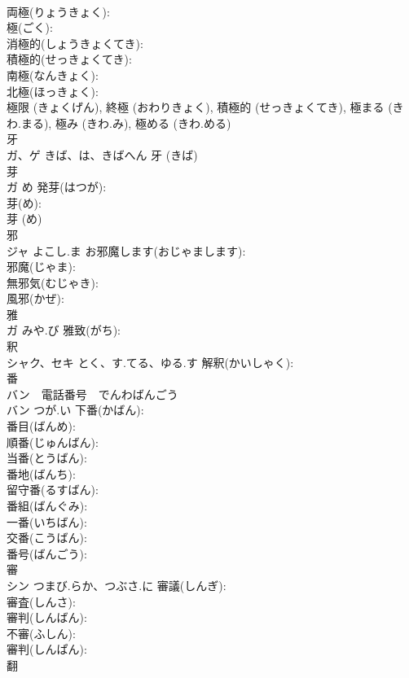 \documentclass[8pt]{extreport}
\begin{document}
\begin{CJK}{UTF8}{min}
\\	両極(りょうきょく): 
\\	極(ごく): 
\\	消極的(しょうきょくてき): 
\\	積極的(せっきょくてき): 
\\	南極(なんきょく): 
\\	北極(ほっきょく): 
\\	極限 (きょくげん), 終極 (おわりきょく), 積極的 (せっきょくてき), 極まる (きわ.まる), 極み (きわ.み), 極める (きわ.める)
\\	牙			
\\	ガ、ゲ	きば、は、きばへん		牙 (きば)
\\	芽			
\\	ガ	め	発芽(はつが): 
\\	芽(め): 
\\	芽 (め)
\\	邪			
\\	ジャ	よこし.ま	お邪魔します(おじゃまします): 
\\	邪魔(じゃま): 
\\	無邪気(むじゃき): 
\\	風邪(かぜ): 
\\	雅			
\\	ガ	みや.び	雅致(がち): 
\\	釈			
\\	シャク、セキ	とく、す.てる、ゆる.す	解釈(かいしゃく): 
\\	番			
\\	バン　電話番号　でんわばんごう
\\	バン	つが.い	下番(かばん): 
\\	番目(ばんめ): 
\\	順番(じゅんばん): 
\\	当番(とうばん): 
\\	番地(ばんち): 
\\	留守番(るすばん): 
\\	番組(ばんぐみ): 
\\	一番(いちばん): 
\\	交番(こうばん): 
\\	番号(ばんごう): 
\\	審			
\\	シン	つまび.らか、つぶさ.に	審議(しんぎ): 
\\	審査(しんさ): 
\\	審判(しんばん): 
\\	不審(ふしん): 
\\	審判(しんぱん): 
\\	翻			

\end{CJK}
\end{document}
